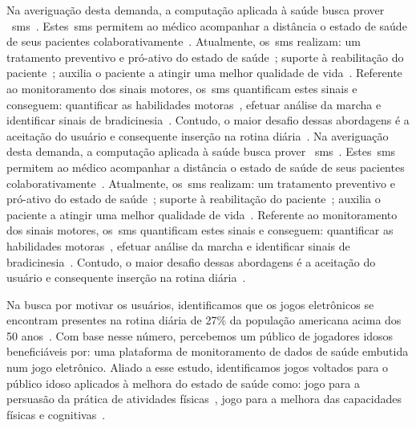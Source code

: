 Na averiguação desta demanda, a computação aplicada à saúde busca prover ~\ac{sms}~\cite{healthmonitoring2013,berg03,bardram2010,Ballegaard:2008:HEL:1357054.1357336,aarhus_negotiating_2010}. Estes~\ac{sms} permitem ao médico acompanhar a distância o estado de saúde de seus pacientes colaborativamente~\cite{healthmonitoring2013}. Atualmente, os~\ac{sms} realizam: um tratamento preventivo e pró-ativo do estado de saúde~\cite{bardram2010}; suporte à reabilitação do paciente~\cite{sacbespoke2014}; auxilia o paciente a atingir uma melhor qualidade de vida~\cite{sacsvmhms2014}. Referente ao monitoramento dos sinais motores, os~\ac{sms} quantificam estes sinais e conseguem: quantificar as habilidades motoras~\cite{manumeterjbhi2014,patel_monitoring_2009}, efetuar análise da marcha \cite{robotgait2014} e identificar sinais de bradicinesia~\cite{ambulatoryparkinson2010}. Contudo, o maior desafio dessas abordagens é a aceitação do usuário e consequente inserção na rotina diária~\cite{alemdar2015}.
Na averiguação desta demanda, a computação aplicada à saúde busca prover ~\ac{sms}~\cite{healthmonitoring2013,berg03,bardram2010,Ballegaard:2008:HEL:1357054.1357336,aarhus_negotiating_2010}. Estes~\ac{sms} permitem ao médico acompanhar a distância o estado de saúde de seus pacientes colaborativamente~\cite{healthmonitoring2013}. Atualmente, os~\ac{sms} realizam: um tratamento preventivo e pró-ativo do estado de saúde~\cite{bardram2010}; suporte à reabilitação do paciente~\cite{sacbespoke2014}; auxilia o paciente a atingir uma melhor qualidade de vida~\cite{sacsvmhms2014}. Referente ao monitoramento dos sinais motores, os~\ac{sms} quantificam estes sinais e conseguem: quantificar as habilidades motoras~\cite{manumeterjbhi2014,patel_monitoring_2009}, efetuar análise da marcha \cite{robotgait2014} e identificar sinais de bradicinesia~\cite{ambulatoryparkinson2010}. Contudo, o maior desafio dessas abordagens é a aceitação do usuário e consequente inserção na rotina diária~\cite{alemdar2015}.

Na busca por motivar os usuários, identificamos que os jogos eletrônicos se encontram presentes na rotina diária de 27\% da população americana acima dos 50 anos~\cite{esa2015}. Com base nesse número, percebemos um público de jogadores idosos beneficiáveis por: uma plataforma de monitoramento de dados de saúde embutida num jogo eletrônico. Aliado a esse estudo, identificamos jogos voltados para o público idoso aplicados à melhora do estado de saúde como: jogo para a persuasão da prática de atividades físicas~\cite{brox11}, jogo para a melhora das capacidades físicas e cognitivas~\cite{arntzen2011}. 

